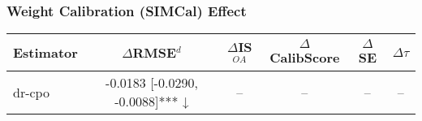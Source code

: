 \subsubsection{Weight Calibration (SIMCal) Effect}
\begin{tabular}{l|ccccc}
\toprule
Estimator & $\Delta$RMSE$^d$ & $\Delta$IS$^{OA}$ & $\Delta$CalibScore & $\Delta$SE & $\Delta\tau$ \\
\midrule
dr-cpo & -0.0183 [-0.0290, -0.0088]*** ↓ & -- & -- & -- & -- \\
\bottomrule
\end{tabular}